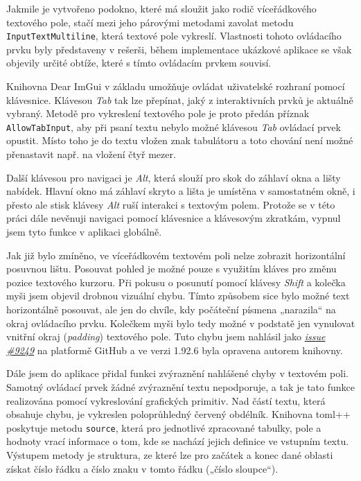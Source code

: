\documentclass[FM,DP]{tulthesis}
\begin{document}
	Jakmile je vytvořeno podokno, které má sloužit jako rodič víceřádkového textového pole, stačí mezi jeho párovými metodami zavolat metodu \texttt{InputTextMultiline}, která textové pole vykreslí. Vlastnosti tohoto ovládacího prvku byly představeny v rešerši, během implementace ukázkové aplikace se však objevily určité obtíže, které s tímto ovládacím prvkem souvisí.
	
	Knihovna Dear ImGui v základu umožňuje ovládat uživatelské rozhraní pomocí klávesnice. Klávesou \textit{Tab} tak lze přepínat, jaký z interaktivních prvků je aktuálně vybraný. Metodě pro vykreslení textového pole je proto předán příznak \texttt{AllowTabInput}, aby při psaní textu nebylo možné klávesou \textit{Tab} ovládací prvek opustit. Místo toho je do textu vložen znak tabulátoru a toto chování není možné přenastavit např. na vložení čtyř mezer.
	
	Další klávesou pro navigaci je \textit{Alt}, která slouží pro skok do záhlaví okna a lišty nabídek. Hlavní okno má záhlaví skryto a lišta je umístěna v samostatném okně, i přesto ale stisk klávesy \textit{Alt} ruší interakci s textovým polem. Protože se v této práci dále nevěnuji navigaci pomocí klávesnice a klávesovým zkratkám, vypnul jsem tyto funkce v aplikaci globálně.

	Jak již bylo zmíněno, ve víceřádkovém textovém poli nelze zobrazit horizontální posuvnou lištu. Posouvat pohled je možné pouze s využitím kláves pro změnu pozice textového kurzoru. Při pokusu o posunutí pomocí klávesy \textit{Shift} a kolečka myši jsem objevil drobnou vizuální chybu. Tímto způsobem sice bylo možné text horizontálně posouvat, ale jen do chvíle, kdy počáteční písmena „narazila“ na okraj ovládacího prvku. Kolečkem myši bylo tedy možné v podstatě jen vynulovat vnitřní okraj (\textit{padding}) textového pole. Tuto chybu jsem nahlásil jako \href{https://github.com/ocornut/imgui/issues/9249}{\textit{issue \#9249}} na platformě GitHub a ve verzi 1.92.6 byla opravena autorem knihovny.

	Dále jsem do aplikace přidal funkci zvýraznění nahlášené chyby v textovém poli. Samotný ovládací prvek žádné zvýraznění textu nepodporuje, a tak je tato funkce realizována pomocí vykreslování grafických primitiv. Nad částí textu, která obsahuje chybu, je vykreslen poloprůhledný červený obdélník. Knihovna toml++ poskytuje metodu \texttt{source}, která pro jednotlivé zpracované tabulky, pole a hodnoty vrací informace o tom, kde se nachází jejich definice ve vstupním textu. Výstupem metody je struktura, ze které lze pro začátek a konec dané oblasti získat číslo řádku a číslo znaku v tomto řádku („číslo sloupce“).
	
\end{document}
